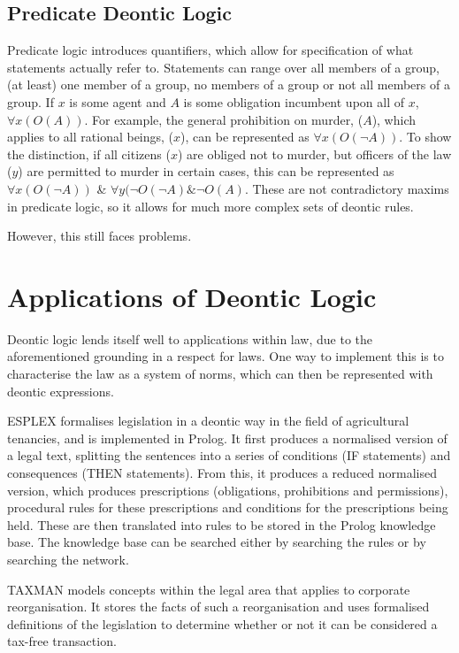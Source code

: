 \documentclass{l4proj}
\begin{document}
\subsection{Predicate Deontic Logic}
Predicate logic\cite{predicate} introduces quantifiers, which allow for specification of what statements actually refer to. Statements can range over all members of a group, (at least) one member of a group, no members of a group or not all members of a group. If $x$ is some agent and $A$ is some obligation incumbent upon all of $x$, \( \forall{x(O(A))} \). For example, the general prohibition on murder, ($A$), which applies to all rational beings, ($x$), can be represented as \( \forall{x(O( \neg A))} \). To show the distinction, if all citizens ($x$) are obliged not to murder, but officers of the law ($y$) are permitted to murder in certain cases, this can be represented as \( \forall{x(O( \neg A))} \) \& \( \forall{y( \neg O( \neg A) \& \neg O(A)} \). These are not contradictory maxims in predicate logic, so it allows for much more complex sets of deontic rules. 

However, this still faces problems. %

\section{Applications of Deontic Logic}
Deontic logic lends itself well to applications within law, due to the aforementioned grounding in a respect for laws. One way to implement this is to characterise the law as a system of norms\cite{law-jonessergot}, which can then be represented with deontic expressions. 

ESPLEX formalises legislation in a deontic way in the field of agricultural tenancies\cite{ESPLEX}, and is implemented in Prolog. It first produces a normalised version of a legal text, splitting the sentences into a series of conditions (IF statements) and consequences (THEN statements). From this, it produces a reduced normalised version, which produces prescriptions (obligations, prohibitions and permissions), procedural rules for these prescriptions and conditions for the prescriptions being held. These are then translated into rules to be stored in the Prolog knowledge base. The knowledge base can be searched either by searching the rules or by searching the network.

TAXMAN models concepts within the legal area that applies to corporate reorganisation\cite{TAXMAN}. It stores the facts of such a reorganisation and uses formalised definitions of the legislation to determine whether or not it can be considered a tax-free transaction. 
\end{document}
